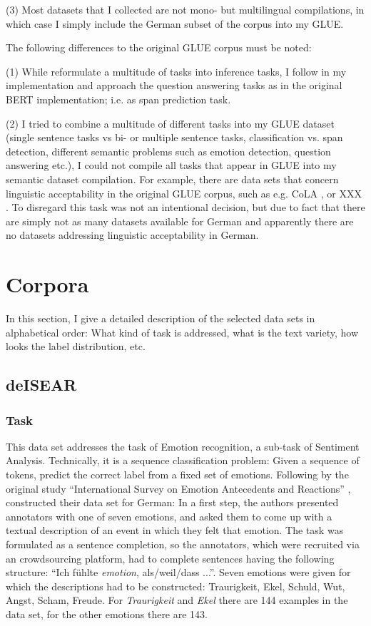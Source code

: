 (3) Most datasets that I collected are not mono- but multilingual compilations, in which case I
simply include the German subset of the corpus into my GLUE.

The following differences to the original GLUE corpus must be noted:

(1) While \cite{wang2018glue} reformulate a multitude of tasks into inference tasks, I follow in
my implementation \cite{zhang2019semantics} and approach the question answering tasks as
\cite{devlin2018bert} in the original BERT implementation; i.e. as span prediction task.

(2) I tried to combine a multitude of different tasks into my GLUE dataset (single sentence tasks
vs bi- or multiple sentence tasks, classification vs. span detection, different semantic problems
such as emotion detection, question answering etc.), I could not compile all tasks that appear in
GLUE into my semantic dataset compilation.
For example, there are data sets that concern linguistic acceptability in the original GLUE
corpus, such as  e.g. CoLA \cite{warstadt2019neural}, or XXX .
To disregard this task was not an intentional decision, but due to fact that there are simply not
as many datasets available for German and apparently there are no datasets addressing linguistic
acceptability in German.

\section{Corpora}

In this section, I give a detailed description of the selected data sets in alphabetical order:
What kind of task is addressed, what is the text variety, how looks the label distribution, etc.

\subsection{deISEAR}

\subsubsection{Task}

This data set addresses the task of Emotion recognition, a sub-task of Sentiment Analysis.
Technically, it is a sequence classification problem: Given a sequence of tokens, predict the
correct label from a fixed set of emotions.
Following by the original study ``International Survey on Emotion Antecedents and Reactions''
\citep{scherer1994evidence}, \cite{troiano2019crowdsourcing} constructed their data set for German:
In a first step, the authors presented annotators with one of seven emotions, and asked them to
come up with a textual description of an event in which they felt that emotion.
The task was formulated as a sentence completion, so the annotators, which were recruited via an
crowdsourcing platform, had to complete sentences having the following structure: ``Ich fühlte
\emph{emotion}, als/weil/dass ...''.
Seven emotions were given for which the descriptions had to be constructed:
Traurigkeit, Ekel, Schuld, Wut, Angst, Scham, Freude.
For \emph{Traurigkeit} and \emph{Ekel} there are 144 examples in the data set, for the other
emotions there are 143.

